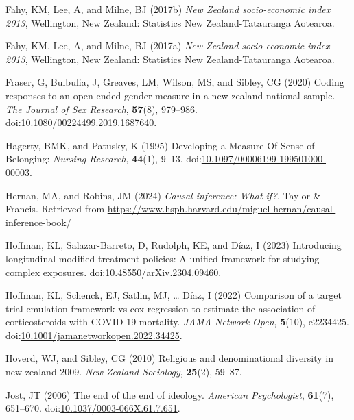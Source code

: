 \documentclass[
  single column]{article}
\newlength{\cslhangindent}
\newenvironment{CSLReferences}[2] %
 {\begin{list}{}{%
  \setlength{\itemindent}{0pt}
  \setlength{\leftmargin}{0pt}
  \setlength{\parsep}{0pt}
  \ifodd #1
   \setlength{\leftmargin}{\cslhangindent}
   \setlength{\itemindent}{-1\cslhangindent}
  \fi
  \setlength{\itemsep}{#2\baselineskip}}}
 {\end{list}}
\begin{document}
\begin{CSLReferences}{1}{0}
Fahy, KM, Lee, A, and Milne, BJ (2017b) \emph{New Zealand socio-economic
index 2013}, Wellington, New Zealand: Statistics New Zealand-Tatauranga
Aotearoa.

Fahy, KM, Lee, A, and Milne, BJ (2017a) \emph{New Zealand socio-economic
index 2013}, Wellington, New Zealand: Statistics New Zealand-Tatauranga
Aotearoa.

Fraser, G, Bulbulia, J, Greaves, LM, Wilson, MS, and Sibley, CG (2020)
Coding responses to an open-ended gender measure in a new zealand
national sample. \emph{The Journal of Sex Research}, \textbf{57}(8),
979--986.
doi:\href{https://doi.org/10.1080/00224499.2019.1687640}{10.1080/00224499.2019.1687640}.

Hagerty, BMK, and Patusky, K (1995) Developing a Measure Of Sense of
Belonging: \emph{Nursing Research}, \textbf{44}(1), 9--13.
doi:\href{https://doi.org/10.1097/00006199-199501000-00003}{10.1097/00006199-199501000-00003}.

Hernan, MA, and Robins, JM (2024) \emph{Causal inference: What if?},
Taylor \& Francis. Retrieved from
\url{https://www.hsph.harvard.edu/miguel-hernan/causal-inference-book/}

Hoffman, KL, Salazar-Barreto, D, Rudolph, KE, and Díaz, I (2023)
Introducing longitudinal modified treatment policies: A unified
framework for studying complex exposures.
doi:\href{https://doi.org/10.48550/arXiv.2304.09460}{10.48550/arXiv.2304.09460}.

Hoffman, KL, Schenck, EJ, Satlin, MJ, \ldots{} Díaz, I (2022) Comparison
of a target trial emulation framework vs cox regression to estimate the
association of corticosteroids with COVID-19 mortality. \emph{JAMA
Network Open}, \textbf{5}(10), e2234425.
doi:\href{https://doi.org/10.1001/jamanetworkopen.2022.34425}{10.1001/jamanetworkopen.2022.34425}.

Hoverd, WJ, and Sibley, CG (2010) Religious and denominational diversity
in new zealand 2009. \emph{New Zealand Sociology}, \textbf{25}(2),
59--87.

Jost, JT (2006) The end of the end of ideology. \emph{American
Psychologist}, \textbf{61}(7), 651--670.
doi:\href{https://doi.org/10.1037/0003-066X.61.7.651}{10.1037/0003-066X.61.7.651}.


\end{CSLReferences}
\end{document}

